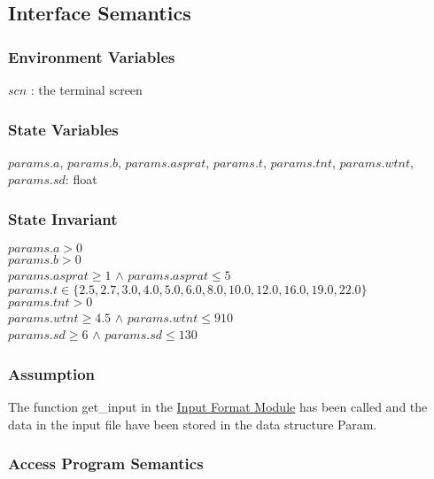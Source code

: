 \documentclass[12pt]{article}
\newcommand{\InputFormat}{\hyperref[SecInF]{Input Format Module}}
\begin{document}
\subsection{Interface Semantics}

\subsubsection{Environment Variables}

$scn$ : the terminal screen

\subsubsection{State Variables}

$params.a$, $params.b$, $params.asprat$, $params.t$, $params.tnt$, $params.wtnt$, $params.sd$: float

\subsubsection{State Invariant}

$params.a > 0$ \\
$params.b > 0$ \\
$params.asprat \geq 1$ $\wedge$ $params.asprat \leq 5$ \\
$params.t \in \{2.5, 2.7, 3.0, 4.0, 5.0, 6.0, 8.0, 10.0, 12.0, 16.0, 19.0, 22.0\}$ \\
$params.tnt > 0$ \\
$params.wtnt \geq 4.5$ $\wedge$ $params.wtnt \leq 910$ \\
$params.sd \geq 6$ $\wedge$ $params.sd \leq 130$

\subsubsection{Assumption}

The function get\_input in the \InputFormat{} has been called and the data in
the input file have been stored in the data structure Param.

\subsubsection{Access Program Semantics}
\end{document}
